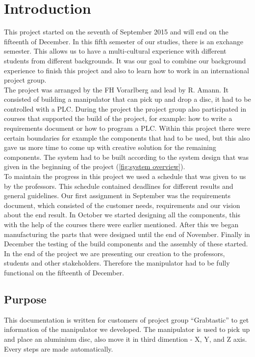 \documentclass[a4paper,12pt]{scrreprt}
\begin{document}
\chapter{Introduction}

This project started on the seventh of September 2015 and will end on the fifteenth of December. In this fifth semester of our studies, there is an exchange semester. This allows us to have a multi-cultural experience with different students from different backgrounds. It was our goal to combine our background experience to finish this project and also to learn how to work in an international project group.\\
The project was arranged by the FH Vorarlberg and lead by R. Amann. It consisted of building a manipulator that can pick up and drop a disc, it had to be controlled with a PLC. During the project the project group also participated in courses that supported the build of the project, for example: how to write a requirements document or how to program a PLC. Within this project there were certain boundaries for example the components that had to be used, but this also gave us more time to come up with creative solution for the remaining components. The system had to be built according to the system design that was given in the beginning of the project (\autoref{fig:system overview}).\\
To maintain the progress in this project we used a schedule that was given to us by the professors. This schedule contained deadlines for different results and general guidelines. Our first assignment in September was the requirements document, which consisted of the customer needs, requirements and our vision about the end result. In October we started designing all the components, this with the help of the courses there were earlier mentioned. After this we began manufacturing the parts that were designed until the end of November. Finally in December the testing of the build components and the assembly of these started. In the end of the project we are presenting our creation to the professors, students and other stakeholders. Therefore the manipulator had to be fully functional on the fifteenth of December. 

\section{Purpose}

This documentation is written for customers of project group \enquote{Grabtastic} to get  information of the manipulator we developed. The manipulator is used to pick up and place an aluminium disc, also move it in third dimention - X, Y, and Z axis. Every steps are made automatically.
\end{document}
